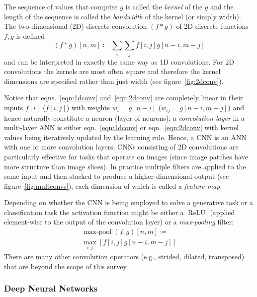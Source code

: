 %
The sequence of values that comprise \(g\) is called the \textit{kernel} of the \(g\) and the length of the sequence is called the \textit{bandwidth} of the kernel (or simply width).
%
The two-dimensional (2D) discrete convolution \((f*g)\) of 2D discrete functions \(f,g\) is defined
\begin{equation}
    (f*g)[n, m]\coloneqq \sum _{i}\sum _{j}f[i, j]g[n-i, m-j]
    \label{eqn:2dconv}
\end{equation}
and can be interpreted in exactly the same way as 1D convolutions.
%
For 2D convolutions the kernels are most often square and therefore the kernel dimensions are specified rather than just width (see figure~\ref{fig:2dconv}).


Notice that eqns.~\eqref{eqn:1dconv} and~\eqref{eqn:2dconv} are completely linear in their inputs \(f[i]\) (\(f[i,j]\)) with weights \(w_i = g[n-i]\) (\(w_{ij} = g[n-i, m-j]\)) and hence naturally constitute a neuron (layer of neurons); a \textit{convolution layer} in a multi-layer ANN is either eqn.~\eqref{eqn:1dconv} or eqn.~\eqref{eqn:2dconv} with kernel values being iteratively updated by the learning rule.
%
Hence, a CNN is an ANN with one or more convolution layers; CNNs consisting of 2D convolutions are particularly effective for tasks that operate on images (since image patches have more structure than image slices).
%
In practice multiple filters are applied to the same input and then stacked to produce a higher-dimensional output (see figure~\ref{fig:multconvs}), each dimension of which is called a \textit{feature map}.

%
Depending on whether the CNN is being employed to solve a generative task or a classification task the activation function might be either a \(\operatorname{ReLU}\) (applied element-wise to the output of the convolution layer) or a \textit{max-pooling} filter:
\begin{multline}
    \operatorname{max-pool}(f,g)[n, m]\coloneqq\\ \max_{i,j}\left[ f[i, j]g[n-i, m-j] \right]
    \label{eqn:2dpool}
\end{multline}
There are many other convolution operators (e.g., strided, dilated, transposed) that are beyond the scope of this survey \cite{dumoulin2016guide}.





\subsubsection{Deep Neural Networks}\label{subsubsec:dnns}





